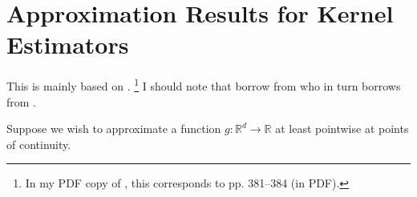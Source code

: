 
\section{Approximation Results for Kernel Estimators}

This is mainly based on
\citet[pp. 362--365]{1999paganNonparametricEconometrics}.%
\footnote{In my PDF copy of \citet{1999paganNonparametricEconometrics}, this
corresponds to pp. 381--384 (in PDF).}
I should note that \citet{1999paganNonparametricEconometrics} borrow from
\citet{1962parzenEstimationProbabilityDensity} who in turn borrows from
\citet{1955bochnerHarmonicAnalysisTheory}.

Suppose we wish to approximate a function \(g : \mathbb{R}^{d} \to \mathbb{R}\)
at least pointwise at points of continuity.


